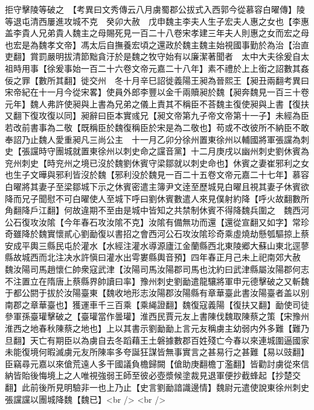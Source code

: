 拒守擊陵等破之　【考異曰文秀傳云八月虜蜀郡公拔式入西郭今從慕容白曜傳】陵等退屯清西屢進攻城不克　癸卯大赦　戊申魏主李夫人生子宏夫人惠之女也【李惠盖李貴人兄弟貴人魏主之母賜死見一百二十八卷宋孝建三年夫人則惠之女而宏之母也宏是為魏孝文帝】馮太后自撫養宏頃之還政於魏主魏主始視國事勤於為治【治直吏翻】賞罰嚴明拔清節黜貪汙於是魏之牧守始有以廉潔著聞者　太中大夫徐爰自太祖時用事【徐爰事始一百二十六卷文帝元嘉二十八年】素不禮於上上銜之詔數其姦佞之罪【數所其翻】徙交州　冬十月辛巳詔徙義陽王昶為晉熙王【昶丑兩翻考異曰宋帝紀在十一月今從宋畧】使員外郎李豐以金千兩贖昶於魏【昶奔魏見一百三十卷元年】魏人弗許使昶與上書為兄弟之儀上責其不稱臣不荅魏主復使昶與上書【復扶又翻下復攻復以同】昶辭曰臣本實彧兄【昶文帝第九子帝文帝第十一子】未經為臣若改前書事為二敬【既稱臣於魏復稱臣於宋是為二敬也】苟或不改彼所不納臣不敢奉詔乃止魏人愛重昶凡三尚公主　十一月乙卯分徐州置東徐州以輔國將軍張讜為刺史【張讜時守團城就置東徐州以刺史命之讜音黨】十二月庚戌以幽州刺史劉休賓為兖州刺史【時兖州之境已沒於魏劉休賓守梁鄒就以刺史命也】休賓之妻崔邪利之女也生子文曄與邪利皆沒於魏【邪利没於魏見一百二十五卷文帝元嘉二十七年】慕容白曜將其妻子至梁鄒城下示之休賓密遣主簿尹文逹至歷城見白曜且視其妻子休賓欲降而兄子聞慰不可白曜使人至城下呼曰劉休賓數遣人來見僕射約降【呼火故翻數所角翻降戶江翻】何故違期不至由是城中皆知之共禁制休賓不得降魏兵圍之　魏西河公石復攻汝隂【今年春石攻汝隂不克】汝隂有備無功而還【還從宣翻又如字】常珍奇雖降於魏實懷貳心劉勔復以書招之會西河公石攻汝隂珍奇乘虛燒劫懸瓠驅掠上蔡安成平輿三縣民屯於灌水【水經注灌水導源廬江金蘭縣西北東陵郷大蘇山東北逕蓼縣故城西而北注决水許愼曰灌水出雩婁縣輿音預】四年春正月己未上祀南郊大赦　魏汝陽司馬趙懷仁帥衆寇武津【汝陽司馬汝陽郡司馬也沈約曰武津縣屬汝陽郡何志不注置立在隋唐上蔡縣界帥讀曰率】豫州刺史劉勔遣龍驤將軍申元德擊破之又斬魏于都公閼于拔於汝陽臺東【魏收地形志汝陽郡汝陽縣有章華臺此書汝陽臺者盖以别南郡之章華臺也】獲運車千三百乘【乘䋲證翻】魏復寇義陽【復扶又翻】勔使司徒參軍孫臺瓘擊破之【臺瓘當作曇瓘】淮西民賈元友上書陳伐魏取陳蔡之策【宋豫州淮西之地春秋陳蔡之地也】上以其書示劉勔勔上言元友稱虜主幼弱内外多難【難乃旦翻】天亡有期臣以為虜自去冬蹈藉王土磐據數郡百姓殘亡今春以來連城圍逼國家未能復境何暇滅虜元友所陳率多夸誕狂謀皆無事實言之甚易行之甚難【易以豉翻】臣竊尋元嘉以來傖荒遠人多干國議負檐歸闕【傖助庚翻檐丁濫翻】皆勸討虜從來信納皆貽後悔境上之人唯視強弱王師至彼必壺漿候塗裁見退軍便抄截蜂起【抄楚交翻】此前後所見明驗非一也上乃止【史言劉勔諳識邊情】魏尉元遣使說東徐州刺史張讜讜以團城降魏【魏已】<br />
<br />
